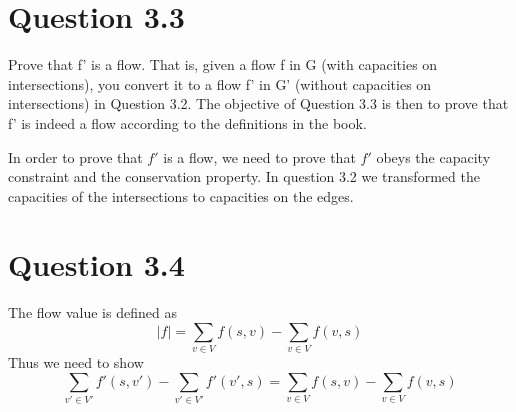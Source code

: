 \documentclass[10pt]{article}
\begin{document}
\section*{Question 3.3} %
\label{sec:question_3_3}
Prove that f' is a flow. That is, given a flow f in G (with capacities on intersections), you convert it to a flow f' in G' (without capacities on intersections) in Question 3.2. The objective of Question 3.3 is then to prove that f' is indeed a flow according to the definitions in the book.

In order to prove that $f'$ is a flow, we need to prove that $f'$ obeys the capacity constraint and the conservation property. In question 3.2 we transformed the capacities of the intersections to capacities on the edges. 


\section*{Question 3.4} %
\label{sec:question_3_4}
The flow value is defined as
\begin{equation}
 |f| = \sum_{v \in V} f(s,v) - \sum_{v \in V} f(v,s)
\end{equation}
Thus we need to show
\begin{equation}
  \sum_{v' \in V'} f'(s,v') - \sum_{v' \in V'} f'(v',s) =   \sum_{v \in V} f(s,v) - \sum_{v \in V} f(v,s)
\end{equation}

% 






\end{document}
